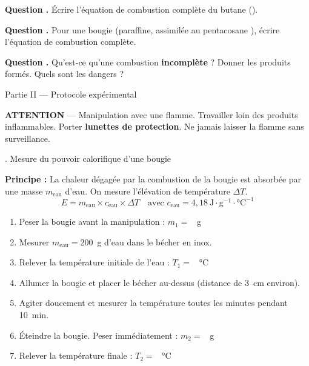 \documentclass[11pt,a4paper]{article}
\newcommand{\sectitle}[1]{%
  \vspace{6pt}
  \noindent\colorbox{exoheader}{\parbox{\dimexpr\linewidth-2\fboxsep}%
    {\color{white}\bfseries\large\strut\quad #1}}
  \vspace{4pt}
}
\newcommand{\subsectitle}[1]{%
  \vspace{4pt}
  \noindent\colorbox{exolight}{\parbox{\dimexpr\linewidth-2\fboxsep}%
    {\color{exoheader}\bfseries\strut\quad #1}}
  \vspace{2pt}
}
\newcounter{question}
\newcommand{\question}{%
  \stepcounter{question}%
  \noindent\textcolor{exoheader}{\textbf{Question \thequestion.}}\quad
}
\begin{document}
\question Écrire l'équation de combustion complète du butane (). \dotfill

\vspace{0.3cm}\noindent\dotfill

\question Pour une bougie (paraffine, assimilée au pentacosane ),
écrire l'équation de combustion complète. \dotfill

\vspace{0.3cm}\noindent\dotfill

\question Qu'est-ce qu'une combustion \textbf{incomplète} ? Donner les produits formés.
Quels sont les dangers ? \dotfill

\vspace{0.3cm}\noindent\dotfill

\sectitle{Partie II --- Protocole expérimental}

\begin{mdframed}[backgroundcolor=orange!15, linecolor=warnorange, linewidth=2pt]
\textbf{\textcolor{warnorange}{\faExclamationTriangle\quad ATTENTION}} ---
Manipulation avec une flamme. Travailler loin des produits inflammables.
Porter \textbf{lunettes de protection}. Ne jamais laisser la flamme sans surveillance.
\end{mdframed}

\vspace{4pt}
\subsectitle{1. Mesure du pouvoir calorifique d'une bougie}

\textbf{Principe :} La chaleur dégagée par la combustion de la bougie est absorbée
par une masse $m_{\text{eau}}$ d'eau. On mesure l'élévation de température $\Delta T$.
\[
  E = m_{\text{eau}} \times c_{\text{eau}} \times \Delta T
  \quad \text{avec } c_{\text{eau}} = 4{,}18~\text{J}\cdot\text{g}^{-1}\cdot\text{°C}^{-1}
\]

\vspace{4pt}
\begin{enumerate}[leftmargin=1.5cm, label=\textcolor{exoheader}{\textbf{\arabic*.}}]
  \item Peser la bougie avant la manipulation : $m_1 = $ \dotfill~g
  \item Mesurer $m_{\text{eau}} = 200$~g d'eau dans le bécher en inox.
  \item Relever la température initiale de l'eau : $T_1 = $ \dotfill~°C
  \item Allumer la bougie et placer le bécher au-dessus (distance de 3~cm environ).
  \item Agiter doucement et mesurer la température toutes les minutes pendant 10~min.
  \item Éteindre la bougie. Peser immédiatement : $m_2 = $ \dotfill~g
  \item Relever la température finale : $T_2 = $ \dotfill~°C
\end{enumerate}
\end{document}
